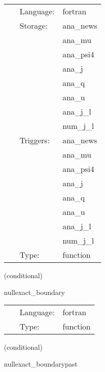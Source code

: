 \hspace{5mm}

 \begin{tabular*}{160mm}{cll} 
~ & Language:  & fortran \\ 
~ & Storage:  & ana\_news \\ 
~& ~ &ana\_mu\\ 
~& ~ &ana\_psi4\\ 
~& ~ &ana\_j\\ 
~& ~ &ana\_q\\ 
~& ~ &ana\_u\\ 
~& ~ &ana\_j\_l\\ 
~& ~ &num\_j\_l\\ 
~ & Triggers:  & ana\_news \\ 
~& ~ &ana\_mu\\ 
~& ~ &ana\_psi4\\ 
~& ~ &ana\_j\\ 
~& ~ &ana\_q\\ 
~& ~ &ana\_u\\ 
~& ~ &ana\_j\_l\\ 
~& ~ &num\_j\_l\\ 
~ & Type:  & function \\ 
\end{tabular*} 


\vspace{5mm}

   (conditional) 

\hspace{5mm} nullexact\_boundary 

\hspace{5mm}{\it exact boundary data for the characteristic evolution variables } 


\hspace{5mm}

 \begin{tabular*}{160mm}{cll} 
~ & Language:  & fortran \\ 
~ & Type:  & function \\ 
\end{tabular*} 


\vspace{5mm}

   (conditional) 

\hspace{5mm} nullexact\_boundarypast 

\hspace{5mm}{\it exact boundary data for the characteristic evolution variables, past level } 


